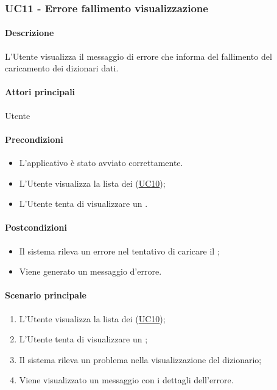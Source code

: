 \subsubsection{UC11 - Errore fallimento visualizzazione }\label{UC11}
\paragraph*{Descrizione}
L’Utente visualizza il messaggio di errore che informa del fallimento del caricamento dei dizionari dati.

\paragraph*{Attori principali}
Utente

\paragraph*{Precondizioni}
\begin{itemize}
  \item L'applicativo è stato avviato correttamente.
  \item L'Utente visualizza la lista dei  (\hyperref[UC10]{UC10});
  \item L'Utente tenta di visualizzare un .
\end{itemize}

\paragraph*{Postcondizioni}
\begin{itemize}
  \item Il sistema rileva un errore nel tentativo di caricare il ;
  \item Viene generato un messaggio d'errore.
\end{itemize}

\paragraph*{Scenario principale}
\begin{enumerate}
  \item L’Utente visualizza la lista dei  (\hyperref[UC10]{UC10});
  \item L'Utente tenta di visualizzare un ;
  \item Il sistema rileva un problema nella visualizzazione del dizionario;
  \item Viene visualizzato un messaggio con i dettagli dell'errore.  
\end{enumerate}
